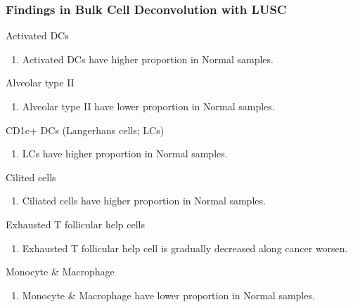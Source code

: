 \documentclass{beamer}
\begin{document}
    \begin{frame}[allowframebreaks]
        \frametitle{Findings in Bulk Cell Deconvolution with LUSC}

        \begin{block}{Activated DCs}
            \begin{enumerate}
                \item Activated DCs have higher proportion in Normal samples.
            \end{enumerate}
        \end{block}

        \begin{block}{Alveolar type II}
            \begin{enumerate}
                \item Alveolar type II have lower proportion in Normal samples.
            \end{enumerate}
        \end{block}

        \begin{block}{CD1c+ DCs (Langerhans cells; LCs)}
            \begin{enumerate}
                \item LCs have higher proportion in Normal samples.
            \end{enumerate}
        \end{block}

        \begin{block}{Cilited cells}
            \begin{enumerate}
                \item Ciliated cells have higher proportion in Normal samples.
            \end{enumerate}
        \end{block}

        \begin{block}{Exhausted T follicular help cells}
            \begin{enumerate}
                \item Exhausted T follicular help cell is gradually decreased along cancer worsen.
            \end{enumerate}
        \end{block}

        \begin{block}{Monocyte \& Macrophage}
            \begin{enumerate}
                \item Monocyte \& Macrophage have lower proportion in Normal samples.
            \end{enumerate}
        \end{block}


\end{frame}
\end{document}
